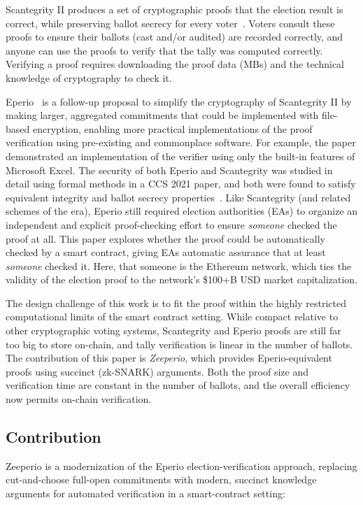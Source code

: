 Scantegrity II produces a set of cryptographic proofs that the election result is correct, while preserving ballot secrecy for every voter~\cite{KTV10c,BDGR21}. Voters consult these proofs to ensure their ballots (cast and/or audited) are recorded correctly, and anyone can use the proofs to verify that the tally was computed correctly. Verifying a proof requires downloading the proof data (MBs) and the technical knowledge of cryptography to check it.

Eperio~\cite{ECHA10} is a follow-up proposal to simplify the cryptography of Scantegrity II by making larger, aggregated commitments that could be implemented with file-based encryption, enabling more practical implementations of the proof verification using pre-existing and commonplace software.
For example, the paper demonstrated an implementation of the verifier using only the built-in features of Microsoft Excel.
The security of both Eperio and Scantegrity was studied in detail using formal methods in a CCS 2021 paper, and both were found to satisfy equivalent integrity and ballot secrecy properties~\cite{BDGR21}.
Like Scantegrity (and related schemes of the era), Eperio still required election authorities (EAs) to organize an independent and explicit proof-checking effort to ensure {\em someone} checked the proof at all. This paper explores whether the proof could be automatically checked by a smart contract, giving EAs automatic assurance that at least {\em someone} checked it. Here, that someone is the Ethereum network, which ties the validity of the election proof to the network's \$100+B USD market capitalization.

The design challenge of this work is to fit the proof within the highly restricted computational limits of the smart contract setting. While compact relative to other cryptographic voting systems, Scantegrity and Eperio proofs are still far too big to store on-chain, and tally verification is linear in the number of ballots. The contribution of this paper is {\em Zeeperio}, which provides Eperio-equivalent proofs using succinct (zk-SNARK) arguments. Both the proof size and verification time are constant in the number of ballots, and the overall efficiency now permits on-chain verification.

\subsection{Contribution}

Zeeperio is a modernization of the Eperio election-verification approach, replacing cut-and-choose full-open commitments with modern, succinct knowledge arguments for automated verification in a smart-contract setting:

